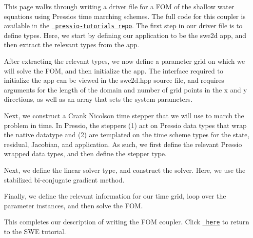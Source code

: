 This page walks through writing a driver file for a F\+OM of the shallow water equations using Pressio\textquotesingle{}s time marching schemes. The full code for this coupler is available in the \href{https://github.com/Pressio/pressio-tutorials/blob/swe2d_tutorial/tutorials/swe2d/offline_phase/run_fom_for_training_params.cc}{\texttt{ pressio-\/tutorials repo}}. The first step in our driver file is to define types. Here, we start by defining our application to be the swe2d app, and then extract the relevant types from the app. 
\begin{DoxyCode}{0}
\end{DoxyCode}


After extracting the relevant types, we now define a parameter grid on which we will solve the F\+OM, and then initialize the app. The interface required to initialize the app can be viewed in the swe2d.\+hpp source file, and requires arguments for the length of the domain and number of grid points in the x and y directions, as well as an array that sets the system parameters. 
\begin{DoxyCode}{0}
\end{DoxyCode}


Next, we construct a Crank Nicolson time stepper that we will use to march the problem in time. In Pressio, the steppers (1) act on Pressio data types that wrap the native datatype and (2) are templated on the time scheme types for the state, residual, Jacobian, and application. As such, we first define the relevant Pressio wrapped data types, and then define the stepper type. 
\begin{DoxyCode}{0}
\end{DoxyCode}


Next, we define the linear solver type, and construct the solver. Here, we use the stabilized bi-\/conjugate gradient method. 
\begin{DoxyCode}{0}
\end{DoxyCode}


Finally, we define the relevant information for our time grid, loop over the parameter instances, and then solve the F\+OM. 
\begin{DoxyCode}{0}
\end{DoxyCode}


This completes our description of writing the F\+OM coupler. Click \href{./md_pages_tutorials_tutorial3.html}{\texttt{ here}} to return to the S\+WE tutorial. 